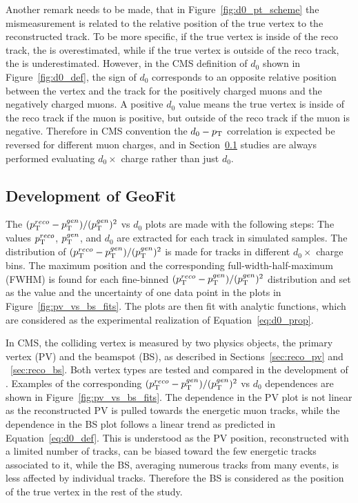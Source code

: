 Another remark needs to be made, that in Figure~\ref{fig:d0_pt_scheme} the \pt mismeasurement is related to the relative position of the true vertex to the reconstructed track.
To be more specific, if the true vertex is inside of the reco track, the \pt is overestimated, 
while if the true vertex is outside of the reco track, the \pt is underestimated. 
However, in the CMS definition of $d_0$ shown in Figure~\ref{fig:d0_def}, the sign of $d_0$ corresponds to an opposite relative position between the vertex and the track
for the positively charged muons and the negatively charged muons. 
A positive $d_0$ value means the true vertex is inside of the reco track if the muon is positive, but outside of the reco track if the muon is negative.
Therefore in CMS convention the $d_0-p_{\mathrm{T}}$ correlation is expected be reversed for different muon charges,
and in Section~\ref{sec:dev_geofit} studies are always performed evaluating $d_0 \times$ charge rather than just $d_0$.

\subsection{Development of GeoFit}\label{sec:dev_geofit}

The $(p_{\mathrm{T}}^{reco}-p_{\mathrm{T}}^{gen})/ (p_{\mathrm{T}}^{gen})^{2}$ vs $d_0$ plots are made with the following steps:
The values $p_{\mathrm{T}}^{reco}$, $p_{\mathrm{T}}^{gen}$, and $d_0$ are extracted for each track in simulated samples.
The distribution of $(p_{\mathrm{T}}^{reco}-p_{\mathrm{T}}^{gen})/ (p_{\mathrm{T}}^{gen})^{2}$ is made for tracks in different $d_0 \times$ charge bins.
The maximum position and the corresponding full-width-half-maximum (FWHM) is found for each 
fine-binned $(p_{\mathrm{T}}^{reco}-p_{\mathrm{T}}^{gen})/ (p_{\mathrm{T}}^{gen})^{2}$ distribution and set as the value and the uncertainty
of one data point in the plots in Figure~\ref{fig:pv_vs_bs_fits}.
The plots are then fit with analytic functions, which are considered as the experimental realization of Equation~\ref{eq:d0_prop}.

In CMS, the colliding vertex is measured by two physics objects, 
the primary vertex (PV) and the beamspot (BS), as described in Sections~\ref{sec:reco_pv} and ~\ref{sec:reco_bs}.
Both vertex types are tested and compared in the development of \GeoFit.
Examples of the corresponding $(p_{\mathrm{T}}^{reco}-p_{\mathrm{T}}^{gen})/ (p_{\mathrm{T}}^{gen})^{2}$ vs $d_0$ dependences are shown in Figure~\ref{fig:pv_vs_bs_fits}.
The dependence in the PV plot is not linear as the reconstructed PV is pulled towards the energetic muon tracks,
while the dependence in the BS plot follows a linear trend as predicted in Equation~\ref{eq:d0_def}.
This is understood as the PV position, reconstructed with a limited number of tracks, 
can be biased toward the few energetic tracks associated to it, 
while the BS, averaging numerous tracks from many events, is less affected by individual tracks.
Therefore the BS is considered as the position of the true vertex in the rest of the study.


